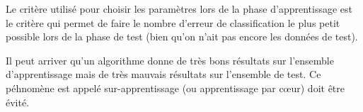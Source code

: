 Le critère utilisé pour choisir les paramètres lors de la phase d'apprentissage est le critère qui permet de faire le nombre d'erreur de classification
le plus petit possible lors de la phase de test (bien qu'on n'ait pas encore les données de test).

Il peut arriver qu'un algorithme donne de très bons résultats sur l'ensemble d'apprentissage mais de très mauvais résultats sur l'ensemble de test.
Ce péhnomène est appelé sur-apprentissage (ou apprentissage par cœur) doit être évité.

